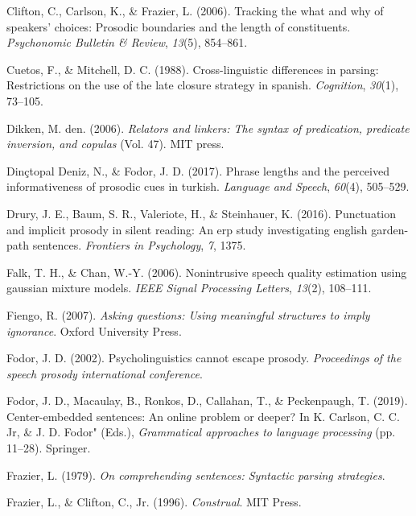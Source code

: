 \documentclass[11pt,oneside]{book}
\begin{document}
\leavevmode\hypertarget{ref-lengthCCFL}{}%
Clifton, C., Carlson, K., \& Frazier, L. (2006). Tracking the what and why of speakers' choices: Prosodic boundaries and the length of constituents. \emph{Psychonomic Bulletin \& Review}, \emph{13}(5), 854--861.

\leavevmode\hypertarget{ref-Cuetos1988-tm}{}%
Cuetos, F., \& Mitchell, D. C. (1988). Cross-linguistic differences in parsing: Restrictions on the use of the late closure strategy in spanish. \emph{Cognition}, \emph{30}(1), 73--105.

\leavevmode\hypertarget{ref-den2006relators}{}%
Dikken, M. den. (2006). \emph{Relators and linkers: The syntax of predication, predicate inversion, and copulas} (Vol. 47). MIT press.

\leavevmode\hypertarget{ref-nazik}{}%
Dinçtopal Deniz, N., \& Fodor, J. D. (2017). Phrase lengths and the perceived informativeness of prosodic cues in turkish. \emph{Language and Speech}, \emph{60}(4), 505--529.

\leavevmode\hypertarget{ref-cps}{}%
Drury, J. E., Baum, S. R., Valeriote, H., \& Steinhauer, K. (2016). Punctuation and implicit prosody in silent reading: An erp study investigating english garden-path sentences. \emph{Frontiers in Psychology}, \emph{7}, 1375.

\leavevmode\hypertarget{ref-gmm1}{}%
Falk, T. H., \& Chan, W.-Y. (2006). Nonintrusive speech quality estimation using gaussian mixture models. \emph{IEEE Signal Processing Letters}, \emph{13}(2), 108--111.

\leavevmode\hypertarget{ref-fiengo}{}%
Fiengo, R. (2007). \emph{Asking questions: Using meaningful structures to imply ignorance}. Oxford University Press.

\leavevmode\hypertarget{ref-Fodor2002-io}{}%
Fodor, J. D. (2002). Psycholinguistics cannot escape prosody. \emph{Proceedings of the speech prosody international conference}.

\leavevmode\hypertarget{ref-fodor2019center}{}%
Fodor, J. D., Macaulay, B., Ronkos, D., Callahan, T., \& Peckenpaugh, T. (2019). Center-embedded sentences: An online problem or deeper? In K. Carlson, C. C. Jr, \& J. D. Fodor" (Eds.), \emph{Grammatical approaches to language processing} (pp. 11--28). Springer.

\leavevmode\hypertarget{ref-Frazier1979-pb}{}%
Frazier, L. (1979). \emph{On comprehending sentences: Syntactic parsing strategies}.

\leavevmode\hypertarget{ref-frazier1996construal}{}%
Frazier, L., \& Clifton, C., Jr. (1996). \emph{Construal}. MIT Press.
\end{document}
